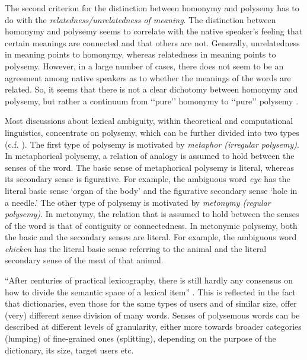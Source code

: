 \documentclass[11pt]{article}
\begin{document}
The second criterion for the distinction between homonymy and polysemy has to
do with the \emph{relatedness/unrelatedness of meaning}.  The distinction
between homonymy and polysemy seems to correlate with the native speaker’s
feeling that certain meanings are connected and that others are not. Generally,
unrelatedness in meaning points to homonymy, whereas relatedness in meaning
points to polysemy.  However, in a large number of cases, there does not seem
to be an agreement among native speakers as to whether the meanings of the
words are related. So, it seems that there is not a clear dichotomy between
homonymy and polysemy, but rather a continuum from ‘‘pure’’ homonymy to
‘‘pure’’ polysemy \citep{Lyons:1977}.

Most discussions about lexical ambiguity, within theoretical and computational
linguistics, concentrate on polysemy, which can be further divided into two
types (c.f. \cite{Apresjan:1974,Pustejovsky:1995}). The first type of polysemy
is motivated by \emph{metaphor (irregular polysemy)}. In metaphorical polysemy,
a relation of analogy is assumed to hold between the senses of the word. The
basic sense of metaphorical polysemy is literal, whereas its secondary sense is
figurative. For example, the ambiguous word \emph{eye} has the literal basic
sense  `organ of the body' and the figurative secondary sense `hole in a
needle.' The other type of polysemy is motivated by \emph{metonymy (regular
polysemy)}. In metonymy, the relation that is assumed to hold between the
senses of the word is that of contiguity or connectedness.
In metonymic polysemy, both the basic and the secondary senses are literal. For
example, the ambiguous word \emph{chicken} has the literal basic sense
referring to the animal and the literal secondary sense of the meat of that
animal. 


``After centuries of practical lexicography, there is still hardly any
consensus on how to divide the semantic space of a lexical item''
\citep{Meer:2006}. This is reflected in the fact that dictionaries, even those
for the same types of users and of similar size, offer (very) different sense
division of many words. 
Senses of polysemous words can be described at different levels of granularity,
either more towards broader categories (lumping) of fine-grained ones
(splitting), depending on the purpose of the dictionary, its size, target users
etc.
\end{document}
